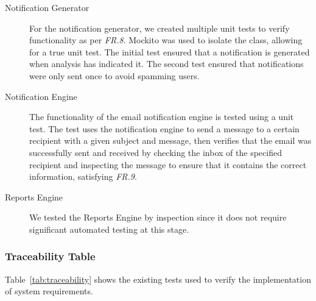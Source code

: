 \documentclass[10pt,a4paper]{article}
\newcommand{\frit}[1]{\textit{FR.#1}}
\begin{document}
\begin{description}
  \item[Notification Generator] For the notification generator, we created 
	multiple unit tests to verify functionality as per \frit{8}. Mockito was 
	used to isolate the class, allowing for a true unit test. The initial 
	test ensured that a notification is generated when analysis has indicated 
	it. The second test ensured that notifications were only sent once to 
	avoid spamming users.	 
  
  \item[Notification Engine] The functionality of the email notification 
	engine is tested using a unit test. The test uses the notification engine 
	to send a message to a certain recipient with a given subject and
	message, then verifies that the email was successfully sent and 
	received by checking the inbox of the specified recipient and 
	inspecting the message to ensure that it contains the correct 
	information, satisfying \frit{9}.

  \item[Reports Engine] We tested the Reports Engine by inspection since it 
	does not require significant automated testing at this stage.

 \end{description}

\subsubsection{Traceability Table}

Table~\ref{tab:traceability} shows the existing tests used to verify the implementation of system requirements.
\end{document}
